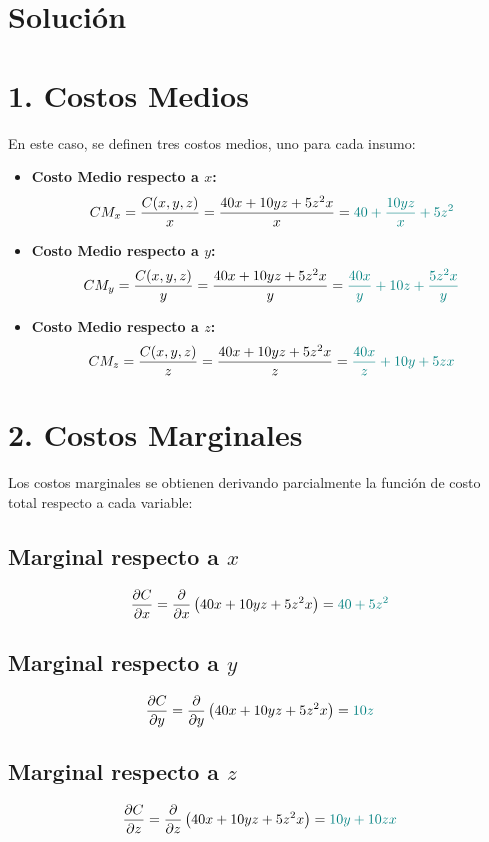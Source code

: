 \documentclass{article}
\begin{document}
\newpage
\section*{Solución}
 
\section*{1. Costos Medios}

En este caso, se definen tres costos medios, uno para cada insumo:

\begin{itemize}
    \item \textbf{Costo Medio respecto a \(x\):}
    \[
    CM_x = \frac{C(x,y,z)}{x} = \frac{40x + 10yz + 5z^2x}{x} = \color{teal}40 + \frac{10yz}{x} + 5z^2
    \]
    
    \item \textbf{Costo Medio respecto a \(y\):}
    \[
    CM_y = \frac{C(x,y,z)}{y} = \frac{40x + 10yz + 5z^2x}{y} = \color{teal}\frac{40x}{y} + 10z + \frac{5z^2x}{y}
    \]
    
    \item \textbf{Costo Medio respecto a \(z\):}
    \[
    CM_z = \frac{C(x,y,z)}{z} = \frac{40x + 10yz + 5z^2x}{z} = \color{teal}\frac{40x}{z} + 10y + 5zx
    \]
\end{itemize}

\section*{2. Costos Marginales}

Los costos marginales se obtienen derivando parcialmente la función de costo total respecto a cada variable:

\subsection*{Marginal respecto a \(x\)}
\[
\frac{\partial C}{\partial x} = \frac{\partial}{\partial x} \left( 40x + 10yz + 5z^2x \right) = \color{teal}40 + 5z^2
\]

\subsection*{Marginal respecto a \(y\)}
\[
\frac{\partial C}{\partial y} = \frac{\partial}{\partial y} \left( 40x + 10yz + 5z^2x \right) = \color{teal}10z
\]

\subsection*{Marginal respecto a \(z\)}
\[
\frac{\partial C}{\partial z} = \frac{\partial}{\partial z} \left( 40x + 10yz + 5z^2x \right) = \color{teal}10y + 10zx
\]
\end{document}
